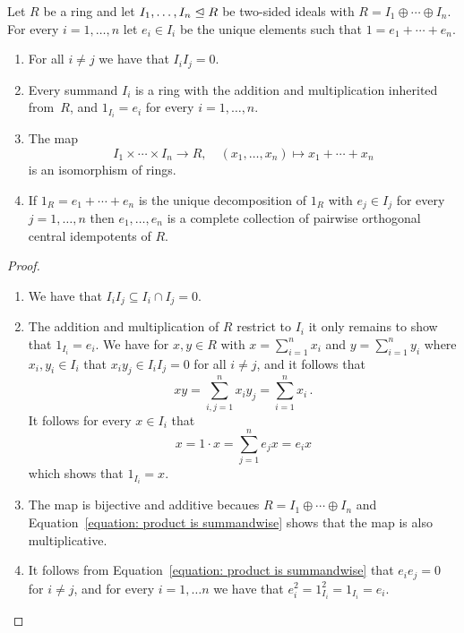 \begin{proposition}
  \label{proposition: factor ideals are again rings}
  Let $R$ be a ring and let $I_1, \dotsc, I_n \trianglelefteq R$ be two-sided ideals with $R = I_1 \oplus \dotsb \oplus I_n$.
  For every $i = 1, \dotsc, n$ let $e_i \in I_i$ be the unique elements such that $1 = e_1 + \dotsb + e_n$.
  \begin{enumerate}
    \item
      For all $i \neq j$ we have that $I_i I_j = 0$.
    \item
      Every summand $I_i$ is a ring with the addition and multiplication inherited from~$R$, and $1_{I_i} = e_i$ for every $i = 1, \dotsc, n$.
    \item
      The map
      \[
                I_1 \times \dotsb \times I_n
        \to     R,
        \quad   (x_1, \dotsc, x_n)
        \mapsto x_1 + \dotsb + x_n
      \]
      is an isomorphism of rings.
    \item
      If $1_R = e_1 + \dotsb + e_n$ is the unique decomposition of $1_R$ with $e_j \in I_j$ for every $j = 1, \dotsc, n$ then $e_1, \dotsc, e_n$ is a complete collection of pairwise orthogonal central idempotents of $R$.
  \end{enumerate}
\end{proposition}


\begin{proof}
  \leavevmode
  \begin{enumerate}
    \item
      We have that $I_i I_j \subseteq I_i \cap I_j = 0$.
    \item
      The addition and multiplication of $R$ restrict to $I_i$ it only remains to show that $1_{I_i} = e_i$.
      We have for $x, y \in R$ with $x = \sum_{i=1}^n x_i$ and $y = \sum_{i=1}^n y_i$ where $x_i, y_i \in I_i$ that
      $x_i y_j \in I_i I_j = 0$ for all $i \neq j$, and it follows that
      \begin{equation}
        \label{equation: product is summandwise}
          x y
        = \sum_{i,j=1}^n x_i y_j
        = \sum_{i=1}^n x_i \,.
      \end{equation}
      It follows for every $x \in I_i$ that
      \[
          x
        = 1 \cdot x
        = \sum_{j=1}^n e_j x
        = e_i x
      \]
      which shows that $1_{I_i} = x$.
    \item
      The map is bijective and additive becaues $R = I_1 \oplus \dotsb \oplus I_n$ and Equation~\eqref{equation: product is summandwise} shows that the map is also multiplicative.
    \item
      It follows from Equation~\eqref{equation: product is summandwise} that $e_i e_j = 0$ for $i \neq j$, and for every $i = 1, \dotsc n$ we have that $e_i^2 = 1_{I_i}^2 = 1_{I_i} = e_i$.
    \qedhere
  \end{enumerate}
\end{proof}


